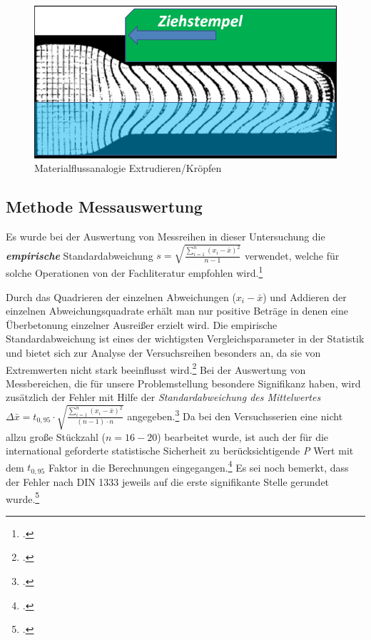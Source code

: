 \documentclass[12pt,a4paper,parskip]{scrartcl}
\begin{document}
\begin{figure}[hbtp]
\centering
\includegraphics[width=.8\textwidth]{materialflussvergleich}
\caption{Materialflussanalogie Extrudieren/Kröpfen\protect\footnotemark}
\label{fig:git}
\end{figure}












  











\subsection{Methode Messauswertung}
Es wurde bei der Auswertung von Messreihen in dieser Untersuchung  die \textbf{\emph{empirische}} Standardabweichung 
 $ s= \sqrt{\frac{\sum \limits_{i=1}^n (x_i - \bar{x})^2}{n-1}} $  verwendet, welche für solche Operationen von der Fachliteratur empfohlen wird.\footcite[Vgl.][301]{mf} 

Durch das Quadrieren der einzelnen Abweichungen ($ x_i-\bar{x}$) und Addieren der einzelnen Abweichungsquadrate erhält man nur positive Beträge in denen eine Überbetonung einzelner Ausreißer erzielt wird.
Die empirische Standardabweichung ist   eines der wichtigsten Vergleichsparameter in der Statistik und bietet sich zur Analyse der Versuchsreihen besonders an, da sie von Extremwerten nicht stark beeinflusst wird.\footcite[Vgl.][54]{gst} Bei der Auswertung von Messbereichen, die für unsere Problemstellung besondere Signifikanz haben, wird zusätzlich der Fehler mit Hilfe der  \emph{Standardabweichung des Mittelwertes}  $ \Delta\bar{x}= t_{0,95} \cdot \sqrt{\frac{\sum \limits_{i=1}^n (x_i - \bar{x})^2}{(n-1)\cdot n}}$  angegeben.\footcite[Vgl.][16]{ph} Da bei den Versuchsserien eine nicht allzu große Stückzahl ($ n=16-20 $) bearbeitet wurde,  ist auch der für die international geforderte statistische Sicherheit zu berücksichtigende \emph{P} Wert mit dem $ t_{0,95} $ Faktor in die Berechnungen eingegangen.\footcite[Vgl.][609]{tp}  Es sei noch bemerkt, dass der Fehler nach DIN 1333 jeweils auf die erste signifikante Stelle gerundet wurde.\footcite[Vgl.][612]{tp}
 	 	
\end{document}
